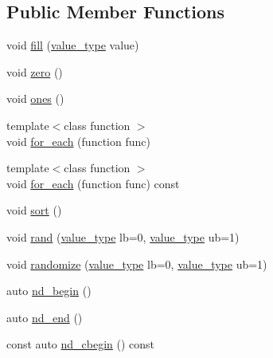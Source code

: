 \subsection*{Public Member Functions}
\begin{DoxyCompactItemize}
\item 
void \hyperlink{classBC_1_1tensors_1_1Tensor__IterAlgos_a3cbe906191eeff137dfbf3db5d7b6311}{fill} (\hyperlink{classBC_1_1tensors_1_1Tensor__IterAlgos_af844f0eb5c403f54c5b466749c296ae0}{value\+\_\+type} value)
\item 
void \hyperlink{classBC_1_1tensors_1_1Tensor__IterAlgos_a3196a468be599f0b2567528a7cf57a9a}{zero} ()
\item 
void \hyperlink{classBC_1_1tensors_1_1Tensor__IterAlgos_a94a328122bd3ac10237a81b25f342c2e}{ones} ()
\item 
{\footnotesize template$<$class function $>$ }\\void \hyperlink{classBC_1_1tensors_1_1Tensor__IterAlgos_af7b4d964089f369687e3a2f586123067}{for\+\_\+each} (function func)
\item 
{\footnotesize template$<$class function $>$ }\\void \hyperlink{classBC_1_1tensors_1_1Tensor__IterAlgos_a6e33180c6cdf070dc1239ed2faf63dcf}{for\+\_\+each} (function func) const 
\item 
void \hyperlink{classBC_1_1tensors_1_1Tensor__IterAlgos_a3f9e12cf0336d98edccd6bf4362021c7}{sort} ()
\item 
void \hyperlink{classBC_1_1tensors_1_1Tensor__IterAlgos_aeead630e0fd0f1b2e41f1ad2f5485837}{rand} (\hyperlink{classBC_1_1tensors_1_1Tensor__IterAlgos_af844f0eb5c403f54c5b466749c296ae0}{value\+\_\+type} lb=0, \hyperlink{classBC_1_1tensors_1_1Tensor__IterAlgos_af844f0eb5c403f54c5b466749c296ae0}{value\+\_\+type} ub=1)
\item 
void \hyperlink{classBC_1_1tensors_1_1Tensor__IterAlgos_aeb4b2cce63f26a922257ff2038aa67bc}{randomize} (\hyperlink{classBC_1_1tensors_1_1Tensor__IterAlgos_af844f0eb5c403f54c5b466749c296ae0}{value\+\_\+type} lb=0, \hyperlink{classBC_1_1tensors_1_1Tensor__IterAlgos_af844f0eb5c403f54c5b466749c296ae0}{value\+\_\+type} ub=1)
\item 
auto \hyperlink{classBC_1_1tensors_1_1Tensor__IterAlgos_a791e906b41519aa00b5936c90f6691f9}{nd\+\_\+begin} ()
\item 
auto \hyperlink{classBC_1_1tensors_1_1Tensor__IterAlgos_a57c16c64298dc18b878a50048bd2ffee}{nd\+\_\+end} ()
\item 
const auto \hyperlink{classBC_1_1tensors_1_1Tensor__IterAlgos_a66b061939207478d0a3793375080b6c4}{nd\+\_\+cbegin} () const 

\end{DoxyCompactItemize}
